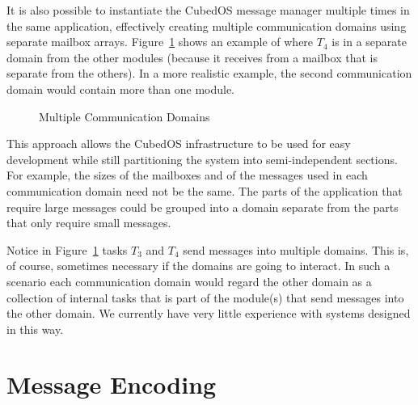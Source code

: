 It is also possible to instantiate the CubedOS message manager multiple times in the same
application, effectively creating multiple communication domains using separate mailbox arrays.
Figure~\ref{fig:multi-domain} shows an example of where $T_4$ is in a separate domain from the
other modules (because it receives from a mailbox that is separate from the others). In a more
realistic example, the second communication domain would contain more than one module.

\begin{figure}[tbhp]
  \center
  \caption{Multiple Communication Domains}
  \label{fig:multi-domain}
\end{figure}

This approach allows the CubedOS infrastructure to be used for easy development while still
partitioning the system into semi-independent sections. For example, the sizes of the mailboxes
and of the messages used in each communication domain need not be the same. The parts of the
application that require large messages could be grouped into a domain separate from the parts
that only require small messages.

Notice in Figure~\ref{fig:multi-domain} tasks $T_3$ and $T_4$ send messages into multiple
domains. This is, of course, sometimes necessary if the domains are going to interact. In such a
scenario each communication domain would regard the other domain as a collection of internal
tasks that is part of the module(s) that send messages into the other domain. We currently have
very little experience with systems designed in this way.


\section{Message Encoding}
\label{section-message-encoding}

